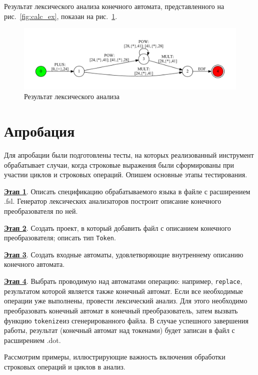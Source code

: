 Результат лексического анализа конечного автомата, представленного на рис.~\ref{fig:calc_ex}, показан на рис.~\ref{fig:calc_ex_res}. 

\begin{figure}[h!]
\begin{center}
\includegraphics[width=1.0\textwidth]{Polubelova/calc_ex_res}
\caption{Результат лексического анализа}
\label{fig:calc_ex_res} 
\end{center}
\end{figure}


\section{Апробация}

Для апробации были подготовлены тесты, на которых реализованный инструмент обрабатывает случаи, когда строковые выражения были сформированы при участии циклов и строковых операций. Опишем основные этапы тестирования.

\textbf{\underline{Этап 1}}. Описать спецификацию обрабатываемого языка в файле с расширением .fsl. Генератор лексических анализаторов построит описание конечного преобразователя по ней. 

\textbf{\underline{Этап 2}}. Создать проект, в который добавить файл с описанием конечного преобразователя; описать тип \verb|Token|. 

\textbf{\underline{Этап 3}}. Создать входные автоматы, удовлетворяющие внутреннему описанию конечного автомата. 

\textbf{\underline{Этап 4}}. Выбрать проводимую над автоматами операцию: например, \verb|replace|, результатом которой является также конечный автомат. Если все необходимые операции уже выполнены, провести лексический анализ. Для этого необходимо преобразовать конечный автомат в конечный преобразователь, затем вызвать функцию \verb|tokenize|из сгенерированного файла. В случае успешного завершения работы, результат (конечный автомат над токенами) будет записан в файл с расширением .dot.

Рассмотрим примеры, иллюстрирующие важность включения обработки строковых операций и циклов в анализ.  


